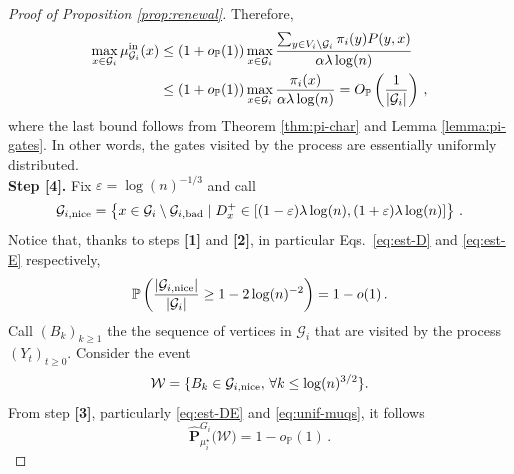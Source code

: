 \documentclass[11pt,oneside]{amsart}
\numberwithin{equation}{section}  %
\theoremstyle{plain}
\newcommand{\p}{\mathbb{P}}
\newcommand{\op}{o_{\p}}
\newcommand{\quench}{\mathbf{P}}
\newcommand{\gates}{\mathcal{G}}
\newcommand{\muinb}{\mu^{\rm in}_{\gates_i}}
\newcommand{\muqs}{\mu^\star_i}
\begin{document}
\begin{proof}[Proof of Proposition \ref{prop:renewal}]
	Therefore, 
	\begin{equation}\label{eq:unif-muqs}
		\begin{split}
			\max_{x\in\gates_i}\muinb(x)&\le (1+\op(1))	\max_{x\in\gates_i}\frac{\sum_{y\in V_i\setminus \gates_i}\pi_i(y)P(y,x)}{\alpha\lambda\log(n)}\\
			&\le (1+\op(1))	\max_{x\in\gates_i}\frac{\pi_i(x)}{\alpha\lambda\log(n)}
			=O_{\p}\left(\frac{1}{|\gates_i|}\right)\,,
		\end{split}
	\end{equation}
	where the last bound follows from Theorem \ref{thm:pi-char} and Lemma \ref{lemma:pi-gates}. In other words, the gates visited by the process are essentially uniformly distributed.\\
    
{\bf Step [4].}  Fix $\varepsilon=\log(n)^{-1/3}$ and call
	\begin{equation}
		\gates_{i,\rm nice}=\left\{x\in\gates_i\setminus\gates_{i,\rm bad}\mid D_x^+\in[(1-\varepsilon)\lambda\log(n),(1+\varepsilon)\lambda\log(n)] \right\}\,.
	\end{equation}
	Notice that, thanks to steps {\bf [1]} and {\bf [2]}, in particular Eqs.~\eqref{eq:est-D} and \eqref{eq:est-E} respectively,
	\begin{equation}\label{eq:est-DE}
		\p\left(\frac{|\gates_{i,\rm nice}|}{|\gates_{i}|}\ge 1-2\log(n)^{-2}\right)=1-o(1)\,.
	\end{equation}
	Call $(B_k)_{k\ge 1}$ the  the sequence of vertices in $\gates_i$ that are visited by the process $(Y_t)_{t\ge 0}$. 
    Consider the event
    $$\mathcal{W} = \{ B_k \in\gates_{i,\rm nice},\, \forall k \le \log(n)^{3/2} \}.$$
	From step \textbf{[3]}, particularly \eqref{eq:est-DE} and \eqref{eq:unif-muqs}, it follows
	\begin{equation}\label{eq:W}
		\hat{\quench}^{G_i}_{\muqs}\big(\mathcal{W} \big)=1-\op(1)\,.
	\end{equation}


\end{proof}
\end{document}
